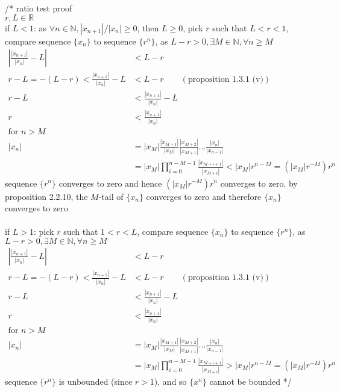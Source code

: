 \documentclass[12pt, border = 4pt, multi]{article} %
\begin{document}
/* ratio test proof\\
$r, L \in \mathbb{R}$\\
if $L < 1$: as $\forall n \in \mathbb{N}, |x_{n + 1}| / |x_n| \geq 0$, then $L \geq 0$, pick $r$ such that $L < r < 1$, compare sequence $\{x_n\}$ to sequence $\{r ^ n\}$, as $L - r > 0, \exists M \in \mathbb{N}, \forall n \geq M$\\
\begin{align*}
\left|\frac{|x_{n + 1}|}{|x_n|} - L\right| &< L - r\\
r - L = -(L - r) < \frac{|x_{n + 1}|}{|x_n|} - L &< L - r \qquad (\text{proposition 1.3.1 (v)})\\
r - L &< \frac{|x_{n + 1}|}{|x_n|} - L\\
r &< \frac{|x_{n + 1}|}{|x_n|}\\
\text{for } n > M\\
|x_n| &= |x_M|\frac{|x_{M + 1}|}{|x_M|}\frac{|x_{M + 2}|}{|x_{M + 1}|}\dots\frac{|x_n|}{|x_{n - 1}|}\\
&= |x_M|\prod_{i = 0} ^ {n - M - 1} \frac{|x_{M + i + 1}|}{|x_{M + i}|} < |x_M|r ^ {n - M} = (|x_M|r ^ {-M})r ^ n
\end{align*}
sequence $\{r ^ n\}$ converges to zero and hence $(|x_M|r ^ {-M})r ^ n$ converges to zero. by proposition 2.2.10, the $M$-tail of $\{x_n\}$ converges to zero and therefore $\{x_n\}$ converges to zero\\
\\
if $L > 1$: pick $r$ such that $1 < r < L$, compare sequence $\{x_n\}$ to sequence $\{r ^ n\}$, as $L - r > 0, \exists M \in \mathbb{N}, \forall n \geq M$
\begin{align*}
\left|\frac{|x_{n + 1}|}{|x_n|} - L\right| &< L - r\\
r - L = -(L - r) < \frac{|x_{n + 1}|}{|x_n|} - L &< L - r \qquad (\text{proposition 1.3.1 (v)})\\
r - L &< \frac{|x_{n + 1}|}{|x_n|} - L\\
r &< \frac{|x_{n + 1}|}{|x_n|}\\
\text{for } n > M\\
|x_n| &= |x_M|\frac{|x_{M + 1}|}{|x_M|}\frac{|x_{M + 2}|}{|x_{M + 1}|}\dots\frac{|x_n|}{|x_{n - 1}|}\\
&= |x_M|\prod_{i = 0} ^ {n - M - 1} \frac{|x_{M + i + 1}|}{|x_{M + i}|} > |x_M|r ^ {n - M} = (|x_M|r ^ {-M})r ^ n
\end{align*}
sequence $\{r ^ n\}$ is unbounded (since $r > 1$), and so $\{x ^ n\}$ cannot be bounded */
\\
\\
\end{document}
